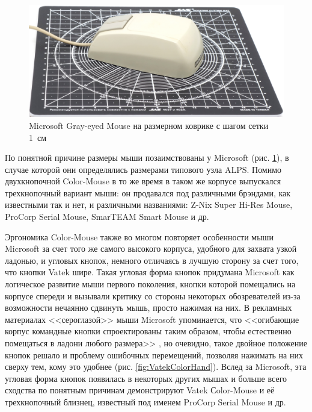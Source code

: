 \documentclass[11pt, a4paper]{article}
\begin{document}
\begin{figure}[h]
    \centering
    \includegraphics[scale=0.4]{1989_vatek_color_mouse/size_30.jpg}
    \caption{Microsoft Gray-eyed Mouse на размерном коврике с шагом сетки 1~см}
    \label{fig:VatekColorSize}
\end{figure}

По понятной причине размеры мыши позаимствованы у Microsoft (рис. \ref{fig:VatekColorSize}), в случае которой они определялись размерами типового узла ALPS. Помимо двухкнопочной Color-Mouse в то же время в таком же корпусе выпускался трехкнопочный вариант мыши: он продавался под различными брэндами, как известными так и нет, и различными названиями: Z-Nix Super Hi-Res Mouse, ProCorp Serial Mouse, SmarTEAM Smart Mouse и др.

Эргономика Color-Mouse также во многом повторяет особенности мыши Microsoft за счет того же самого высокого корпуса, удобного для захвата узкой ладонью, и угловых кнопок, немного отличаясь в лучшую сторону за счет того, что кнопки Vatek шире.
Такая угловая форма кнопок придумана Microsoft как логическое развитие мыши первого поколения, кнопки которой помещались на корпусе спереди и вызывали критику со стороны некоторых обозревателей из-за возможности нечаянно сдвинуть мышь, просто нажимая на них. В рекламных материалах <<сероглазой>> мыши Microsoft упоминается, что <<огибающие корпус командные кнопки спроектированы таким образом, чтобы естественно помещаться в ладони любого размера>> \cite{mouses}, но очевидно, такое двойное положение кнопок решало и проблему ошибочных перемещений, позволяя нажимать на них сверху тем, кому это удобнее (рис. \ref{fig:VatekColorHand}). Вслед за Microsoft, эта угловая форма кнопок появилась в некоторых других мышах и больше всего сходства по понятным причинам демонстрируют Vatek Сolor-Mouse и её трехкнопочный близнец, известный под именем ProCorp Serial Mouse и др.
\end{document}
